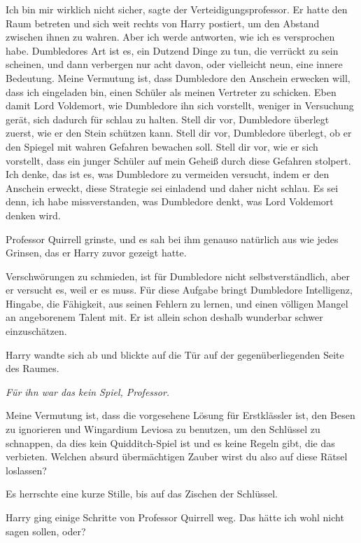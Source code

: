 \glqq{}Ich bin mir wirklich nicht sicher\grqq{}, sagte der
Verteidigungsprofessor. Er hatte den Raum betreten und sich weit rechts von
Harry postiert, um den Abstand zwischen ihnen zu wahren. \glqq{}Aber ich werde
antworten, wie ich es versprochen habe. Dumbledores Art ist es, ein Dutzend
Dinge zu tun, die verrückt zu sein scheinen, und dann verbergen nur acht davon,
oder vielleicht neun, eine innere Bedeutung. Meine Vermutung ist, dass
Dumbledore den Anschein erwecken will, dass ich eingeladen bin, einen Schüler
als meinen Vertreter zu schicken. Eben damit Lord Voldemort, wie Dumbledore ihn
sich vorstellt, weniger in Versuchung gerät, sich dadurch für schlau zu halten.
Stell dir vor, Dumbledore überlegt zuerst, wie er den Stein schützen kann. Stell
dir vor, Dumbledore überlegt, ob er den Spiegel mit wahren Gefahren bewachen
soll. Stell dir vor, wie er sich vorstellt, dass ein junger Schüler auf mein
Geheiß durch diese Gefahren stolpert. Ich denke, das ist es, was Dumbledore zu
vermeiden versucht, indem er den Anschein erweckt, diese Strategie sei einladend
und daher nicht schlau. Es sei denn, ich habe missverstanden, was Dumbledore
denkt, was Lord Voldemort denken wird.\grqq{}

Professor Quirrell grinste, und es sah bei ihm genauso natürlich aus wie jedes
Grinsen, das er Harry zuvor gezeigt hatte.

\glqq{}Verschwörungen zu schmieden, ist für Dumbledore nicht selbstverständlich,
aber er versucht es, weil er es muss. Für diese Aufgabe bringt Dumbledore
Intelligenz, Hingabe, die Fähigkeit, aus seinen Fehlern zu lernen, und einen
völligen Mangel an angeborenem Talent mit. Er ist allein schon deshalb wunderbar
schwer einzuschätzen.\grqq{}

Harry wandte sich ab und blickte auf die Tür auf der gegenüberliegenden Seite
des Raumes.

\emph{Für ihn war das kein Spiel, Professor.}

\glqq{}Meine Vermutung ist, dass die vorgesehene Lösung für Erstklässler ist, den
Besen zu ignorieren und Wingardium Leviosa zu benutzen, um den Schlüssel zu
schnappen, da dies kein Quidditch-Spiel ist und es keine Regeln gibt, die das
verbieten. Welchen absurd übermächtigen Zauber wirst du also auf diese Rätsel
loslassen?\grqq{}

Es herrschte eine kurze Stille, bis auf das Zischen der Schlüssel.

Harry ging einige Schritte von Professor Quirrell weg. \glqq{}Das hätte ich wohl
nicht sagen sollen, oder?\grqq{}

